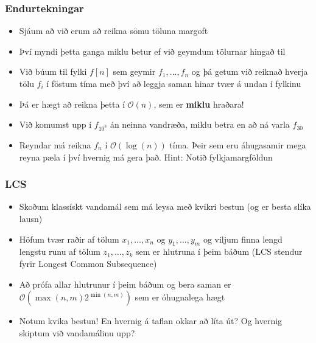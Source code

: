 \documentclass{beamer}
\begin{document}
\begin{frame}
\frametitle{Endurtekningar}

\begin{itemize}

\item<1-> Sjáum að við erum að reikna sömu töluna margoft

\item<2-> Því myndi þetta ganga miklu betur ef við geymdum tölurnar hingað til

\item<3-> Við búum til fylki $f[n]$ sem geymir $f_1,\dots,f_n$ og þá getum við reiknað hverja tölu $f_i$ í föstum tíma með því að leggja saman hinar tvær á undan í fylkinu

\item<4-> Þá er hægt að reikna þetta í $\mathcal{O}(n)$, sem er \textbf{miklu} hraðara!

\item<5-> Við komumst upp í $f_{10^8}$ án neinna vandræða, miklu betra en að ná varla $f_{30}$

\item<6-> Reyndar má reikna $f_n$ í $\mathcal{O}(\log(n))$ tíma. Þeir sem eru áhugasamir mega reyna pæla í því hvernig má gera það. Hint: Notið fylkjamargföldun

\end{itemize}

\end{frame}

\begin{frame}
\frametitle{LCS}

\begin{itemize}

\item<1-> Skoðum klassískt vandamál sem má leysa með kvikri bestun (og er besta slíka lausn)

\item<2-> Höfum tvær raðir af tölum $x_1,\dots,x_n$ og $y_1,\dots,y_m$ og viljum finna lengd lengstu runu af tölum $z_1,\dots,z_k$ sem er hlutruna í þeim báðum (LCS stendur fyrir Longest Common Subsequence)

\item<3-> Að prófa allar hlutrunur í þeim báðum og bera saman er $\mathcal{O}(\max(n, m)2^{\min(n, m)})$ sem er óhugnalega hægt

\item<4-> Notum kvika bestun! En hvernig á taflan okkar að líta út? Og hvernig skiptum við vandamálinu upp?

\end{itemize}

\end{frame}
\end{document}
